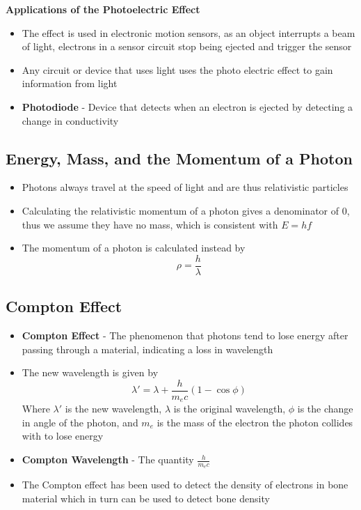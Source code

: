 \textbf{Applications of the Photoelectric Effect}
\begin{itemize}
    \item The effect is used in electronic motion sensors, as an object interrupts a beam of light, electrons in a sensor circuit stop being ejected and trigger the sensor
    \item Any circuit or device that uses light uses the photo electric effect to gain information from light
    \item \textbf{Photodiode} - Device that detects when an electron is ejected by detecting a change in conductivity 
\end{itemize}

\subsection{Energy, Mass, and the Momentum of a Photon}
\begin{itemize}
    \item Photons always travel at the speed of light and are thus relativistic particles
    \item Calculating the relativistic momentum of a photon gives a denominator of 0, thus we assume they have no mass, which is consistent with \(E=hf\)
    \item The momentum of a photon is calculated instead by \[\rho=\frac{h}{\lambda}\]
\end{itemize}

\subsection{Compton Effect}
\begin{itemize}
    \item \textbf{Compton Effect} - The phenomenon that photons tend to lose energy after passing through a material, indicating a loss in wavelength
    \item The new wavelength is given by \[\lambda '=\lambda+\frac{h}{m_ec}(1-\cos\phi)\] Where \(\lambda '\) is the new wavelength, \(\lambda\) is the original wavelength, \(\phi\) is the change in angle of the photon, and \(m_e\) is the mass of the electron the photon collides with to lose energy
    \item \textbf{Compton Wavelength} - The quantity \(\frac{h}{m_ec}\)
    \item The Compton effect has been used to detect the density of electrons in bone material which in turn can be used to detect bone density
\end{itemize}

